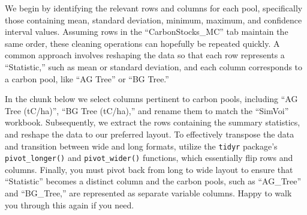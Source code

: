 \documentclass[
]{article}
\begin{document}
We begin by identifying the relevant rows and columns for each pool,
specifically those containing mean, standard deviation, minimum,
maximum, and confidence interval values. Assuming rows in the
``CarbonStocks\_MC'' tab maintain the same order, these cleaning
operations can hopefully be repeated quickly. A common approach involves
reshaping the data so that each row represents a ``Statistic,'' such as
mean or standard deviation, and each column corresponds to a carbon
pool, like ``AG Tree'' or ``BG Tree.''

In the chunk below we select columns pertinent to carbon pools,
including ``AG Tree (tC/ha)'', ``BG Tree (tC/ha),'' and rename them to
match the ``SimVoi'' workbook. Subsequently, we extract the rows
containing the summary statistics, and reshape the data to our preferred
layout. To effectively transpose the data and transition between wide
and long formats, utilize the \texttt{tidyr} package's
\texttt{pivot\_longer()} and \texttt{pivot\_wider()} functions, which
essentially flip rows and columns. Finally, you must pivot back from
long to wide layout to ensure that ``Statistic'' becomes a distinct
column and the carbon pools, such as ``AG\_Tree'' and ``BG\_Tree,'' are
represented as separate variable columns. Happy to walk you through this
again if you need.
\end{document}
